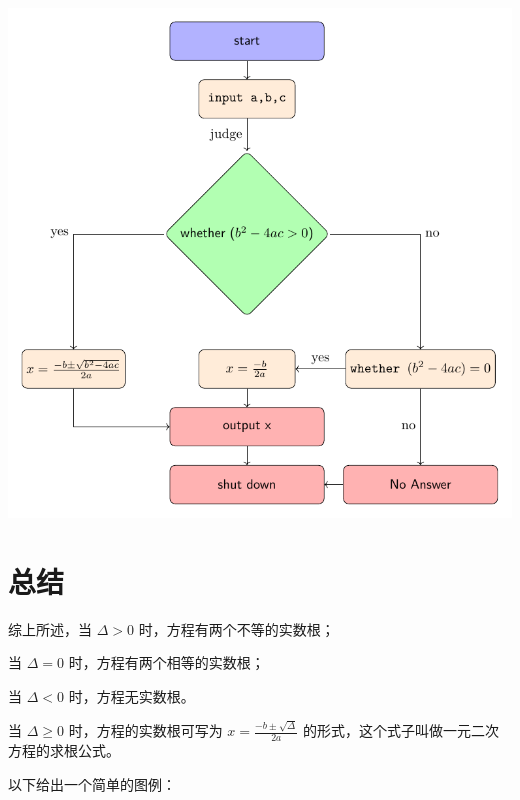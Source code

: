 \documentclass[10pt]{ctexart}
\begin{document}
\includegraphics[scale=0.75]{report_tikz.pdf}

\section{总结}
综上所述，当 $\varDelta > 0$ 时，方程有两个不等的实数根；

当 $\varDelta = 0$ 时，方程有两个相等的实数根；

当 $\varDelta < 0$ 时，方程无实数根。

当 $\varDelta \ge 0$ 时，方程的实数根可写为 $x = \frac{-b \pm \sqrt{\varDelta}}{2a}$ 的形式，这个式子叫做一元二次方程的求根公式。

以下给出一个简单的图例：
\end{document}
